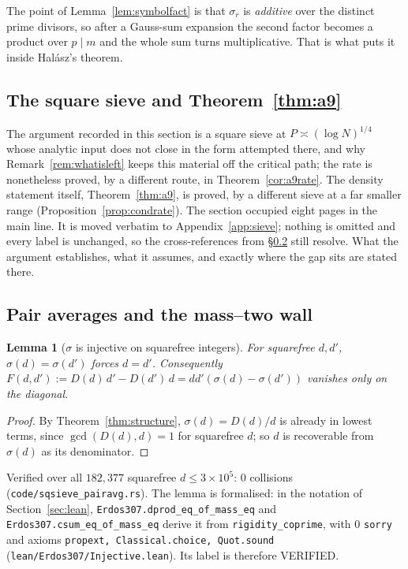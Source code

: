 \documentclass[11pt]{article}
\newtheorem{lemma}[theorem]{Lemma}
\theoremstyle{definition}
\begin{document}
The point of Lemma~\ref{lem:symbolfact} is that $\sigma_r$ is \emph{additive} over the distinct
prime divisors, so after a Gauss-sum expansion the second factor becomes a product over $p\mid m$
and the whole sum turns multiplicative. That is what puts it inside Hal\'asz's theorem.

\subsection{The square sieve and Theorem~\ref{thm:a9}}\label{ssec:sieve}

The argument recorded in this section is a square sieve at $P\asymp(\log N)^{1/4}$ whose analytic
input does not close in the form attempted there, and why Remark~\ref{rem:whatisleft} keeps this
material off the critical path; the rate is nonetheless proved, by a different route, in
Theorem~\ref{cor:a9rate}.
The density statement itself, Theorem~\ref{thm:a9}, is proved, by a different sieve at a far smaller
range (Proposition~\ref{prop:condrate}). The section occupied eight pages in the main line. It is
moved verbatim to Appendix~\ref{app:sieve}; nothing is omitted and every label is unchanged, so the
cross-references from \S\ref{ssec:pairavg} still resolve. What the argument establishes, what it
assumes, and exactly where the gap sits are stated there.

\subsection{Pair averages and the mass--two wall}\label{ssec:pairavg}

\begin{lemma}[$\sigma$ is injective on squarefree integers]\label{lem:sigmainj}
For squarefree $d,d'$, $\sigma(d)=\sigma(d')$ forces $d=d'$. Consequently
$F(d,d'):=D(d)\,d'-D(d')\,d=dd'(\sigma(d)-\sigma(d'))$ vanishes only on the diagonal.
\end{lemma}
\begin{proof}
By Theorem~\ref{thm:structure}, $\sigma(d)=D(d)/d$ is already in lowest terms, since
$\gcd(D(d),d)=1$ for squarefree $d$; so $d$ is recoverable from $\sigma(d)$ as its denominator.
\end{proof}
Verified over all $182{,}377$ squarefree $d\le3\times10^5$: $0$ collisions
\textup{(\texttt{code/sqsieve\_pairavg.rs})}. The lemma is formalised: in the notation of
Section~\ref{sec:lean}, \texttt{Erdos307.dprod\_eq\_of\_mass\_eq} and
\texttt{Erdos307.csum\_eq\_of\_mass\_eq} derive it from \texttt{rigidity\_coprime}, with $0$
\texttt{sorry} and axioms \texttt{propext, Classical.choice, Quot.sound}
\textup{(\texttt{lean/Erdos307/Injective.lean})}. Its label is therefore \textup{VERIFIED}.
\end{document}
